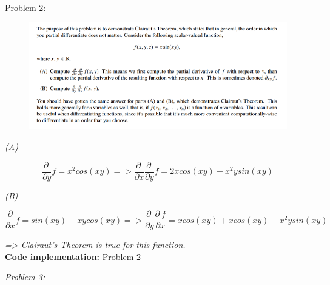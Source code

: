\documentclass[
]{article}
\begin{document}
\newpage
Problem 2:

\includegraphics[width=6.49167in,height=1.84167in]{image2.png}

\emph{(A)}

\[\frac{\partial\ }{\partial y}f = x^{2}cos(xy) = > \frac{\partial\ }{\partial x}\frac{\partial\ }{\partial y}f = 2xcos(xy) - x^{2}ysin(xy)\]

\emph{(B)}

\[\frac{\partial}{\partial x}f = sin(xy) + xycos(xy) = > \frac{\partial\ }{\partial y}\frac{\partial\ f}{\partial x} = xcos(xy) + xcos(xy) - x^{2}ysin(xy)\]

\emph{=\textgreater{} Clairaut's Theorem is true for this function.}\\
\textbf{Code implementation:} \href{https://colab.research.google.com/github/dtungpka/Applied-Mathematics-for-Artificial-Intelligence/blob/main/Assignment_3/Assignment%203.ipynb#scrollTo=Problem_2}{Problem 2}

\newpage
\emph{Problem 3:}
\end{document}
